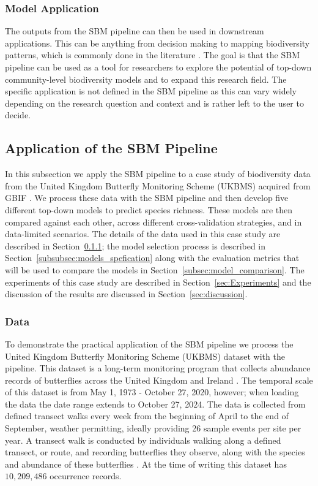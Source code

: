 \subsubsection{Model Application}\label{subsubsec:model_application}
The outputs from the SBM pipeline can then be used in downstream applications. This can be anything from decision making \parencite{IPBES2019spm} to mapping biodiversity patterns, which is commonly done in the literature \parencite{andermann2022, baggstrom2025}. The goal is that the SBM pipeline can be used as a tool for researchers to explore the potential of top-down community-level biodiversity models and to expand this research field. The specific application is not defined in the SBM pipeline as this can vary widely depending on the research question and context and is rather left to the user to decide.

\subsection{Application of the SBM Pipeline}\label{subsec:application}
In this subsection we apply the SBM pipeline to a case study of biodiversity data from the United Kingdom Butterfly Monitoring Scheme (UKBMS) acquired from GBIF \parencite{UKBMS2026}. We process these data with the SBM pipeline and then develop five different top-down models to predict species richness. These models are then compared against each other, across different cross-validation strategies, and in data-limited scenarios. The details of the data used in this case study are described in Section~\ref{subsubsec:data}; the model selection process is described in Section~\ref{subsubsec:models_spefication} along with the evaluation metrics that will be used to compare the models in Section~\ref{subsec:model_comparison}. The experiments of this case study are described in Section~\ref{sec:Experiments} and the discussion of the results are discussed in Section~\ref{sec:discussion}.

\subsubsection{Data}\label{subsubsec:data}

To demonstrate the practical application of the SBM pipeline we process the United Kingdom Butterfly Monitoring Scheme (UKBMS) dataset with the pipeline. This dataset is a long-term monitoring program that collects abundance records of butterflies across the United Kingdom and Ireland \parencite{UKBMS2026}. The temporal scale of this dataset is from May 1, 1973 - October 27, 2020, however; when loading the data the date range extends to October 27, 2024. The data is collected from defined transect walks every week from the beginning of April to the end of September, weather permitting, ideally providing 26 sample events per site per year. A transect walk is conducted by individuals walking along a defined transect, or route, and recording butterflies they observe, along with the species and abundance of these butterflies \parencite{pollard1993}. At the time of writing this dataset has \(10,209,486\) occurrence records. 

